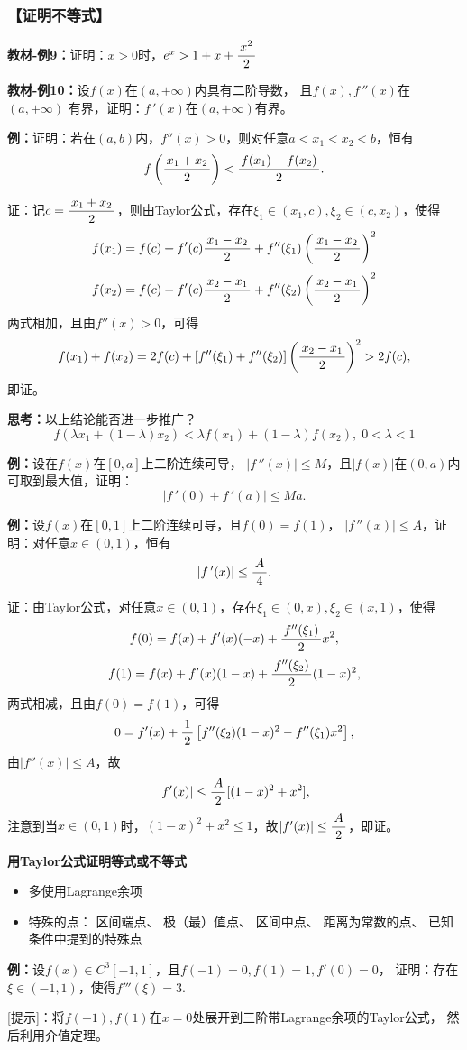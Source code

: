 \subsubsection{【证明不等式】}

{\bf 教材-例9：}证明：$x>0$时，$e^x>1+x+\displaystyle\frac{\,{x^2}\,}{\,{2}\,}$

{\bf 教材-例10：}设$f(x)$在$(a,+\infty)$内具有二阶导数，
且$f(x),f\,''(x)$在$(a,+\infty)$
有界，证明：$f\,'(x)$在$(a,+\infty)$有界。

{\bf 例：}证明：若在$(a,b)$内，$f''(x)>0$，则对任意$a<x_1<x_2<b$，恒有
$$f\left(\displaystyle\frac{\,{x_1+x_2}\,}{\,{2}\,}\right)<\displaystyle\frac{\,{f(x_1)+f(x_2)}\,}{\,{2}\,}.$$

证：记$c=\displaystyle\frac{\,{x_1+x_2}\,}{\,{2}\,}$，则由Taylor公式，存在$\xi_1\in(x_1,c),
\xi_2\in(c,x_2)$，使得
$$f(x_1)=f(c)+f'(c)\displaystyle\frac{\,{x_1-x_2}\,}{\,{2}\,}+f''(\xi_1)
\left(\displaystyle\frac{\,{x_1-x_2}\,}{\,{2}\,}\right)^2$$
$$f(x_2)=f(c)+f'(c)\displaystyle\frac{\,{x_2-x_1}\,}{\,{2}\,}+f''(\xi_2)
\left(\displaystyle\frac{\,{x_2-x_1}\,}{\,{2}\,}\right)^2$$
两式相加，且由$f''(x)>0$，可得
$$f(x_1)+f(x_2)=2f(c)+[f''(\xi_1)+f''(\xi_2)]
\left(\displaystyle\frac{\,{x_2-x_1}\,}{\,{2}\,}\right)^2>2f(c),$$
即证。

{\bf 思考：}以上结论能否进一步推广？
$${f(\lambda x_1+(1-\lambda)x_2)<\lambda
f(x_1)+(1-\lambda)f(x_2),\;0<\lambda<1}$$

{\bf 例：}设在$f(x)$在$[0,a]$上二阶连续可导，
$|f\,''(x)|\leq M$，且$|f(x)|$在$(0,a)$内可取到最大值，证明：
$$|f\,'(0)+f\,'(a)|\leq Ma.$$

{\bf 例：}设$f(x)$在$[0,1]$上二阶连续可导，且$f(0)=f(1)$，
$|f\,''(x)|\leq A$，证明：对任意$x\in(0,1)$，恒有
$$|f\,'(x)|\leq\displaystyle\frac{\,{A}\,}{\,{4}\,}.$$

证：由Taylor公式，对任意$x\in(0,1)$，存在$\xi_1\in(0,x),
\xi_2\in(x,1)$，使得
$$f(0)=f(x)+f'(x)(-x)+\displaystyle\frac{\,{f''(\xi_1)}\,}{\,{2}\,}x^2,$$
$$f(1)=f(x)+f'(x)(1-x)+\displaystyle\frac{\,{f''(\xi_2)}\,}{\,{2}\,}(1-x)^2,$$
两式相减，且由$f(0)=f(1)$，可得
$$0=f'(x)+\displaystyle\frac{\,{1}\,}{\,{2}\,}\left[f''(\xi_2)(1-x)^2-f''(\xi_1)x^2\right],$$
由$|f''(x)|\leq A$，故
$$|f'(x)|\leq\displaystyle\frac{\,{A}\,}{\,{2}\,}[(1-x)^2+x^2],$$
注意到当$x\in(0,1)$时，$(1-x)^2+x^2\leq1$，故$|f'(x)|\leq\displaystyle\frac{\,{A}\,}{\,{2}\,}$，即证。

{\b{\bf 用Taylor公式证明等式或不等式} 
\begin{itemize}
  \item 多使用Lagrange余项
  \item 特殊的点： 区间端点、 极（最）值点、
  区间中点、 距离为常数的点、 已知条件中提到的特殊点
\end{itemize}}

{\bf 例：}设$f(x)\in C^3[-1,1]$，且$f(-1)=0,f(1)=1,f'(0)=0$，
证明：存在$\xi\in(-1,1)$，使得$f'''(\xi)=3$.

[提示]：将$f(-1),f(1)$在$x=0$处展开到三阶带Lagrange余项的Taylor公式，
然后利用介值定理。

